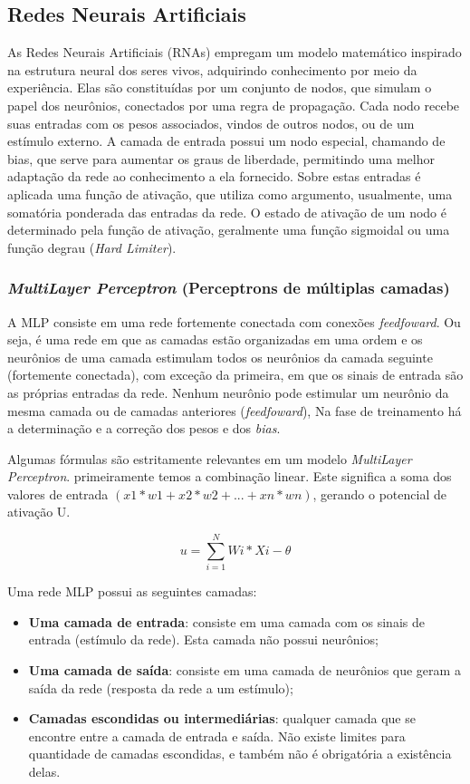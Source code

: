 \documentclass[
	article,			%
	11pt,				%
	oneside,			%
	a4paper,			%
	english,			%
	brazil,				%
	sumario=tradicional
	]{abntex2}
\begin{document}
\subsection{Redes Neurais Artificiais}

As Redes Neurais Artificiais (RNAs) empregam um modelo matemático inspirado na estrutura neural dos seres vivos, adquirindo conhecimento por meio da experiência. Elas são constituídas por um conjunto de nodos, que simulam o papel dos neurônios, conectados por uma regra de propagação. Cada nodo recebe suas entradas com os pesos associados, vindos de outros nodos, ou de um estímulo externo. A camada de entrada possui um nodo especial, chamando de bias, que serve para aumentar os graus de liberdade, permitindo uma melhor adaptação da rede ao conhecimento a ela fornecido. Sobre estas entradas é aplicada uma função de ativação, que utiliza como argumento, usualmente, uma somatória ponderada das entradas da rede. O estado de ativação de um nodo é determinado pela função de ativação, geralmente uma função sigmoidal ou uma função degrau (\textit{Hard Limiter}).

\subsubsection{\textit{MultiLayer Perceptron} (Perceptrons de múltiplas camadas)}

A MLP consiste em uma rede fortemente conectada com conexões \textit{feedfoward}. Ou seja, é uma rede em que as camadas estão organizadas em uma ordem e os neurônios de uma camada estimulam todos os neurônios da camada seguinte (fortemente conectada), com exceção da primeira, em que os sinais de entrada são as próprias entradas da rede. Nenhum neurônio pode estimular um neurônio da mesma camada ou de camadas anteriores (\textit{feedfoward}), Na fase de treinamento há a determinação e a correção dos pesos e dos \textit{bias}.

Algumas fórmulas são estritamente relevantes em um modelo \textit{MultiLayer Perceptron}. primeiramente temos a combinação linear. Este significa a soma dos valores de entrada $(x1 * w1 +  x2 * w2  +  ...  +  xn * wn )$, gerando o potencial de ativação U.

\[ u = \sum_{i=1}^{N} Wi * Xi - \theta \]


Uma rede MLP possui as seguintes camadas:

\begin{itemize}
	\item\textbf{Uma camada de entrada}: consiste em uma camada com os sinais de entrada (estímulo da rede). Esta camada não possui neurônios;
	\item \textbf{Uma camada de saída}: consiste em uma camada de neurônios que geram a saída da rede (resposta da rede a um estímulo);
	\item \textbf{Camadas escondidas ou intermediárias}: qualquer camada que se encontre entre a camada de entrada e saída. Não existe limites para quantidade de camadas escondidas, e também não é obrigatória a existência delas.
\end{itemize}
\end{document}
